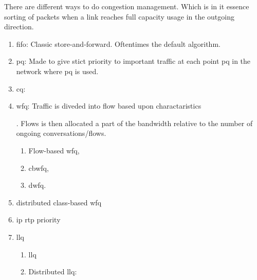 There are different ways to do congestion management. Which is in it essence sorting of packets when a link reaches full capacity usage in the outgoing direction.

\begin{enumerate}
    \item \gls{fifo}: Classic store-and-forward. Oftentimes the default algorithm.
    \item \gls{pq}: Made to give stict priority to important traffic at each point \gls{pq} in the network where \gls{pq} is used.
    \item \gls{cq}: 
    \item \gls{wfq}: Traffic is diveded into flow based upon charactaristics . Flows is then allocated a part of the bandwidth relative to the number of ongoing conversations/flows.
    \begin{enumerate}
        \item Flow-based \gls{wfq},
        \item \gls{cbwfq},
        \item \gls{dwfq}.
    \end{enumerate}
    \item distributed class-based \gls{wfq}
    \item \gls{ip} \gls{rtp} priority
    \item \gls{llq}
    \begin{enumerate}
        \item \gls{llq}
        \item Distributed \gls{llq}: 
    \end{enumerate}
\end{enumerate}
